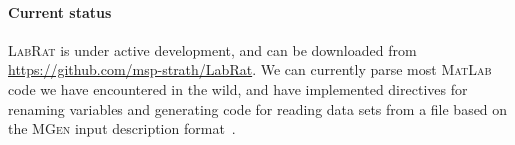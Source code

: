 \documentclass{ws-procs9x6}
\newcommand{\lr}{\textsc{LabRat}}
\newcommand{\ma}{\textsc{MatLab}}
\begin{document}
\paragraph{Current status}

\lr{} is under active development, and can be downloaded from \url{https://github.com/msp-strath/LabRat}. We can currently parse most \ma{} code we have encountered in the wild, and have implemented directives for renaming variables and generating code for reading data sets from a file based on the \textsc{MGen} input description format~\cite{mgen}.



\end{document}
